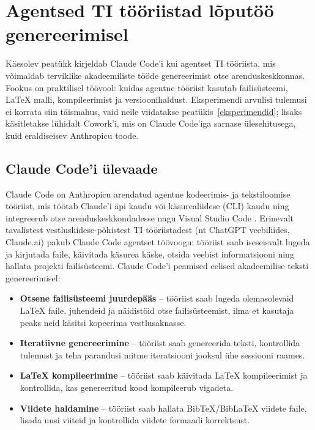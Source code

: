 \section{Agentsed TI tööriistad lõputöö genereerimisel} \label{claudecode}

Käesolev peatükk kirjeldab Claude Code'i kui agentset TI tööriista, mis võimaldab terviklike akadeemiliste tööde genereerimist otse arenduskeskkonnas. Fookus on praktilisel töövool: kuidas agentne tööriist kasutab failisüsteemi, \LaTeX{} malli, kompileerimist ja versioonihaldust. Eksperimendi arvulisi tulemusi ei korrata siin täismahus, vaid neile viidatakse peatükis~\ref{eksperimendid}; lisaks käsitletakse lühidalt Cowork'i, mis on Claude Code'iga sarnase ülesehitusega, kuid eraldiseisev Anthropicu toode.

\subsection{Claude Code'i ülevaade} \label{subsec:claudecode-ulevaade}

Claude Code on Anthropicu arendatud agentne kodeerimis- ja tekstiloomise tööriist, mis töötab Claude'i äpi kaudu või käsurealiidese (CLI) kaudu ning integreerub otse arenduskeskkondadesse nagu Visual Studio Code \cite{anthropic2026claudecode}. Erinevalt tavalistest vestlusliidese-põhistest TI tööriistadest (nt ChatGPT veebiliides, Claude.ai) pakub Claude Code agentset töövoogu: tööriist saab iseseisvalt lugeda ja kirjutada faile, käivitada käsurea käske, otsida veebist informatsiooni ning hallata projekti failisüsteemi.
Claude Code'i peamised eelised akadeemilise teksti genereerimisel:
\begin{itemize}
    \item \textbf{Otsene failisüsteemi juurdepääs} -- tööriist saab lugeda olemasolevaid \LaTeX{} faile, juhendeid ja näidistöid otse failisüsteemist, ilma et kasutaja peaks neid käsitsi kopeerima vestlusaknasse.
    \item \textbf{Iteratiivne genereerimine} -- tööriist saab genereerida teksti, kontrollida tulemust ja teha parandusi mitme iteratsiooni jooksul ühe sessiooni raames.
    \item \textbf{\LaTeX{} kompileerimine} -- tööriist saab käivitada \LaTeX{} kompileerimist ja kontrollida, kas genereeritud kood kompileerub vigadeta.
    \item \textbf{Viidete haldamine} -- tööriist saab hallata BibTeX/BibLaTeX viidete faile, lisada uusi viiteid ja kontrollida viidete formaadi korrektsust.
\end{itemize}

